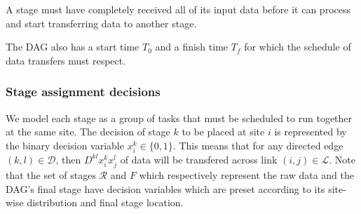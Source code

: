 
\begin{assumption}
	A stage must have completely received all of its input data before it can process and start transferring data to another stage.
\end{assumption}

The DAG also has a start time $T_0$ and a finish time $T_f$ for which the schedule of data transfers must respect.

\subsubsection{Stage assignment decisions}
We model each stage as a group of tasks that must be scheduled to run together at the same site.
The decision of stage $k$ to be placed at site $i$ is represented by the binary decision variable $x_i^k\in\{0,1\}$.
This means that for any directed edge $(k,l)\in\mathcal{D}$, then $D^{kl}x_i^kx_j^l$ of data will be transfered across link $(i,j)\in\mathcal{L}$.
Note that the set of stages $\mathcal{R}$ and $F$ which respectively represent the raw data and the DAG's final stage have decision variables which are preset according to its site-wise distribution and final stage location.



